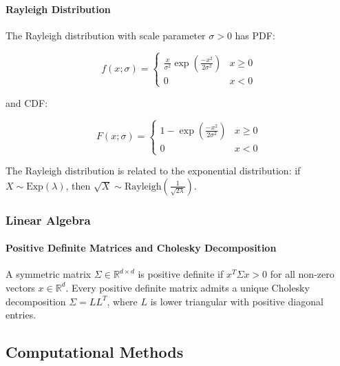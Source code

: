 \paragraph{Rayleigh Distribution}
\label{appendix:rayleigh}

The Rayleigh distribution with scale parameter $\sigma > 0$ has PDF:

\begin{equation*}
    f(x; \sigma) = 
        \begin{cases}
        \frac{x}{\sigma^2} \exp\left(\frac{-x^2}{2\sigma^2}\right) & x \geq 0\\
        0 & x < 0
    \end{cases}
\end{equation*}


and CDF:

\begin{equation*}
    F(x; \sigma) = 
        \begin{cases}
        1 - \exp\left(\frac{-x^2}{2\sigma^2}\right) & x \geq 0\\
        0 & x < 0
    \end{cases}
\end{equation*}

The Rayleigh distribution is related to the exponential distribution: if $X \sim \text{Exp}(\lambda)$, then $\sqrt{X} \sim \text{Rayleigh}\left(\frac{1}{\sqrt{2\lambda}}\right)$.

\subsubsection{Linear Algebra}
\label{appendix:linear-algebra}

\paragraph{Positive Definite Matrices and Cholesky Decomposition}
\label{appendix:Cholesky}

A symmetric matrix $\Sigma \in \mathbb{R}^{d \times d}$ is positive definite if $x^T\Sigma x > 0$ for all non-zero vectors $x \in \mathbb{R}^d$. Every positive definite matrix admits a unique Cholesky decomposition $\Sigma = LL^T$, where $L$ is lower triangular with positive diagonal entries.

\subsection{Computational Methods}
\label{appendix:computational-methods}

